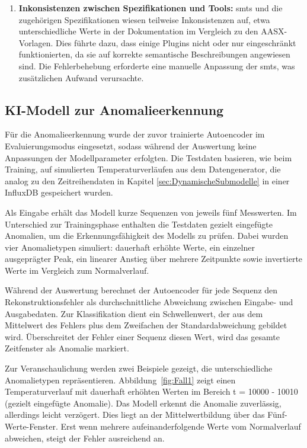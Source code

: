 \begin{enumerate}
    \item \textbf{Inkonsistenzen zwischen Spezifikationen und Tools:}  
    \acsp{smt} und die zugehörigen Spezifikationen wiesen teilweise Inkonsistenzen auf, etwa unterschiedliche Werte in der Dokumentation im Vergleich zu den AASX-Vorlagen.  
    Dies führte dazu, dass einige Plugins nicht oder nur eingeschränkt funktionierten, da sie auf korrekte semantische Beschreibungen angewiesen sind.  
    Die Fehlerbehebung erforderte eine manuelle Anpassung der \acsp{smt}, was zusätzlichen Aufwand verursachte.
\end{enumerate}

\newpage
\subsection{KI-Modell zur Anomalieerkennung}

Für die Anomalieerkennung wurde der zuvor trainierte Autoencoder im Evaluierungsmodus eingesetzt, sodass während der Auswertung keine Anpassungen der Modellparameter erfolgten.
Die Testdaten basieren, wie beim Training, auf simulierten Temperaturverläufen aus dem Datengenerator, die analog zu den Zeitreihendaten in Kapitel \ref{sec:DynamischeSubmodelle} in einer InfluxDB gespeichert wurden.

Als Eingabe erhält das Modell kurze Sequenzen von jeweils fünf Messwerten.
Im Unterschied zur Trainingsphase enthalten die Testdaten gezielt eingefügte Anomalien, um die Erkennungsfähigkeit des Modells zu prüfen.
Dabei wurden vier Anomalietypen simuliert: dauerhaft erhöhte Werte, ein einzelner ausgeprägter Peak, ein linearer Anstieg über mehrere Zeitpunkte sowie invertierte Werte im Vergleich zum Normalverlauf.

Während der Auswertung berechnet der Autoencoder für jede Sequenz den Rekonstruktionsfehler als durchschnittliche Abweichung zwischen Eingabe- und Ausgabedaten. 
Zur Klassifikation dient ein Schwellenwert, der aus dem Mittelwert des Fehlers plus dem Zweifachen der Standardabweichung gebildet wird. 
Überschreitet der Fehler einer Sequenz diesen Wert, wird das gesamte Zeitfenster als Anomalie markiert.

Zur Veranschaulichung werden zwei Beispiele gezeigt, die unterschiedliche Anomalietypen repräsentieren. 
Abbildung~\ref{fig:Fall1} zeigt einen Temperaturverlauf mit dauerhaft erhöhten Werten im Bereich t = 10000 - 10010 (gezielt eingefügte Anomalie). 
Das Modell erkennt die Anomalie zuverlässig, allerdings leicht verzögert. 
Dies liegt an der Mittelwertbildung über das Fünf-Werte-Fenster.
Erst wenn mehrere aufeinanderfolgende Werte vom Normalverlauf abweichen, steigt der Fehler ausreichend an.

